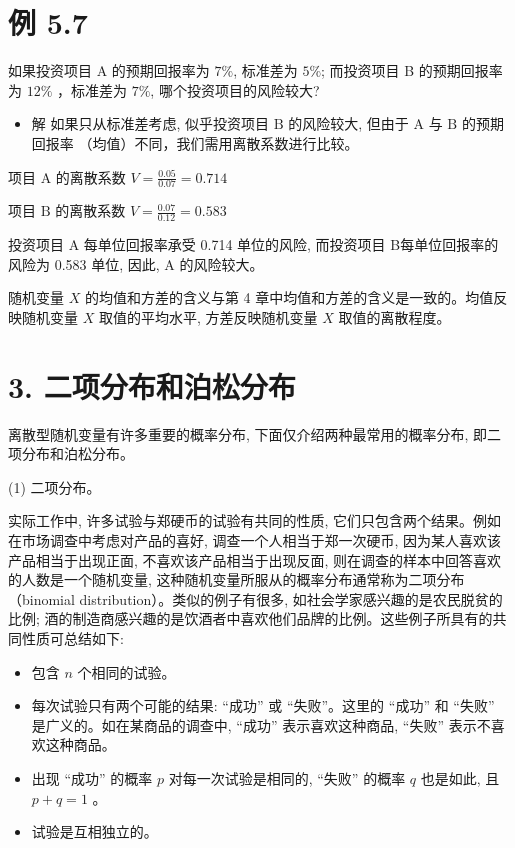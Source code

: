 \documentclass[10pt]{article}
\begin{document}
\begin{CJK*}{UTF8}{bsmi}
\section*{例 5.7}
如果投资项目 A 的预期回报率为 $7 \%$, 标准差为 $5 \%$; 而投资项目 B 的预期回报率为 $12 \%$ ，标准差为 $7 \%$, 哪个投资项目的风险较大?

\begin{itemize}
  \item 解 如果只从标准差考虑, 似乎投资项目 $\mathrm{B}$ 的风险较大, 但由于 $\mathrm{A}$ 与 $\mathrm{B}$ 的预期回报率 （均值）不同，我们需用离散系数进行比较。
\end{itemize}

项目 $\mathrm{A}$ 的离散系数 $V=\frac{0.05}{0.07}=0.714$

项目 $\mathrm{B}$ 的离散系数 $V=\frac{0.07}{0.12}=0.583$

投资项目 $\mathrm{A}$ 每单位回报率承受 0.714 单位的风险, 而投资项目 B每单位回报率的风险为 0.583 单位, 因此, $\mathrm{A}$ 的风险较大。

随机变量 $X$ 的均值和方差的含义与第 4 章中均值和方差的含义是一致的。均值反映随机变量 $X$ 取值的平均水平, 方差反映随机变量 $X$ 取值的离散程度。

\section*{3. 二项分布和泊松分布}
离散型随机变量有许多重要的概率分布, 下面仅介绍两种最常用的概率分布, 即二项分布和泊松分布。

(1) 二项分布。

实际工作中, 许多试验与郑硬币的试验有共同的性质, 它们只包含两个结果。例如在市场调查中考虑对产品的喜好, 调查一个人相当于郑一次硬币, 因为某人喜欢该产品相当于出现正面, 不喜欢该产品相当于出现反面, 则在调查的样本中回答喜欢的人数是一个随机变量, 这种随机变量所服从的概率分布通常称为二项分布（binomial distribution）。类似的例子有很多, 如社会学家感兴趣的是农民脱贫的比例; 酒的制造商感兴趣的是饮酒者中喜欢他们品牌的比例。这些例子所具有的共同性质可总结如下:

\begin{itemize}
  \item 包含 $n$ 个相同的试验。
  \item 每次试验只有两个可能的结果: “成功” 或 “失败”。这里的 “成功” 和 “失败” 是广义的。如在某商品的调查中, “成功” 表示喜欢这种商品, “失败” 表示不喜欢这种商品。
  \item 出现 “成功” 的概率 $p$ 对每一次试验是相同的, “失败” 的概率 $q$ 也是如此, 且 $p+q=1$ 。
  \item 试验是互相独立的。
\end{itemize}


\end{CJK*}
\end{document}
